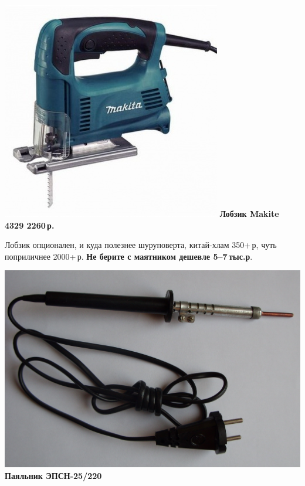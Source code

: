 {\begin{multicols}{2}
\noindent\href{http://leroymerlin.ru/catalogue/instrumenty/elektroinstrument/lobziki/12114283/}{
\includegraphics[width=\columnwidth]{00/fig/LobzMakita4329.jpg}}
\textbf{Лобзик Makite 4329 2260\,р.}
\end{multicols}

Лобзик опционален, и куда полезнее шуруповерта, китай-хлам 350+\,р, чуть
поприличнее 2000+\,р. \textbf{Не берите с маятником дешевле 5--7\,тыс.р}.


\begin{multicols}{2}
\noindent\includegraphics[width=\columnwidth]{00/fig/EPSN25.jpg}
\textbf{Паяльник ЭПСН-25/220}


\end{multicols}}
